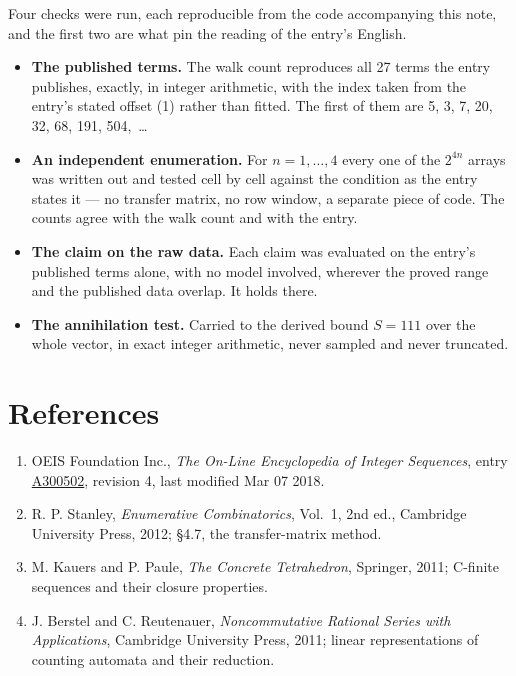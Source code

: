 \documentclass[11pt]{article}
\theoremstyle{definition}
\begin{document}
Four checks were run, each reproducible from the code accompanying this note, and the first two are what pin the reading of the entry's English.

\begin{itemize}

\item {\bfseries The published terms.} The walk count reproduces all 27 terms the entry publishes, exactly, in integer arithmetic, with the index taken from the entry's stated offset (1) rather than fitted. The first of them are 5, 3, 7, 20, 32, 68, 191, 504,~\dots

\item {\bfseries An independent enumeration.} For $n = 1,\dots,4$ every one of the $2^{4n}$ arrays was written out and tested cell by cell against the condition as the entry states it --- no transfer matrix, no row window, a separate piece of code. The counts agree with the walk count and with the entry.

\item {\bfseries The claim on the raw data.} Each claim was evaluated on the entry's published terms alone, with no model involved, wherever the proved range and the published data overlap. It holds there.

\item {\bfseries The annihilation test.} Carried to the derived bound $S = 111$ over the whole vector, in exact integer arithmetic, never sampled and never truncated.

\end{itemize}

\section{References}

\begin{enumerate}

\item OEIS Foundation Inc., \emph{The On-Line Encyclopedia of Integer Sequences}, entry \href{https://oeis.org/A300502}{A300502}, revision 4, last modified Mar 07 2018.

\item R. P. Stanley, \emph{Enumerative Combinatorics}, Vol.~1, 2nd ed., Cambridge University Press, 2012; \S4.7, the transfer-matrix method.

\item M. Kauers and P. Paule, \emph{The Concrete Tetrahedron}, Springer, 2011; C-finite sequences and their closure properties.

\item J. Berstel and C. Reutenauer, \emph{Noncommutative Rational Series with Applications}, Cambridge University Press, 2011; linear representations of counting automata and their reduction.

\end{enumerate}
\end{document}
